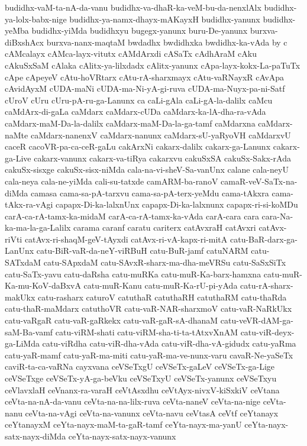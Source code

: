 {budidhx-vaM-ta-nA-da-vanu
budidhx-va-dhaR-ka-veM-bu-da-nenxlAlx
budidhx-ya-lolx-babx-nige
budidhx-ya-namx-dhayx-mAKayxH
budidhx-yanunx
budidhx-yeMba
budidhx-yiMda
budidhxyu
bugegx-yanunx
buru-De-yanunx
burxva-diBxshAcx
burxva-nanx-maqtaM
bwdadhx
bwdidhxka
bwdidhx-ka-vAda
by
c
cAMcalayx
cAMca-layx-vitutx
cAMdArxdi
cASaTx
cAdhAraM
cAku
cAkuSxSaM
cAlaka
cAlitx-ya-lilxdadx
cAlitx-yanunx
cApa-layx-kokx-La-paTuTx
cApe
cApeyeV
cAtu-hoVRtarx
cAtu-rA-sharxmayx
cAtu-vaRNayxR
cAvApa
cAvidAyxM
cUDA-maNi
cUDA-ma-Ni-yA-gi-ruva
cUDA-ma-Nuyx-pa-ni-Satf
cUroV
cUru
cUru-pA-ru-ga-Lanunx
ca
caLi-gAla
caLi-gA-la-dalilx
caMcu
caMdArx-di-gaLa
caMdarx
caMdarx-cUDa
caMdarx-ka-lA-dha-ra-vAda
caMdarx-maM-Da-la-dalilx
caMdarx-maM-Da-la-ga-tamf
caMdarxna
caMdarx-naMte
caMdarx-nanenxV
caMdarx-nanunx
caMdarx-sU-yaRyoVH
caMdarxvU
caceR
cacoVR-pa-ca-ceR-gaLu
cakArxNi
cakarx-dalilx
cakarx-ga-Lanunx
cakarx-ga-Live
cakarx-vanunx
cakarx-va-tiRya
cakarxvu
cakuSxSA
cakuSx-Sakx-rAda
cakuSx-sisxge
cakuSx-sisx-niMda
cala-na-vi-sheV-Sa-vanUnx
calane
cala-neyU
cala-neya
cala-ne-yiMda
cali-su-tatxde
camARM-ba-ranoV
camaR-veV-SaTx-na-diMda
camasa
cama-sa-pA-tarxvu
cama-sa-pA-terx-yeMdu
cama-tAkxra
cama-tAkx-ra-vAgi
capapx-Di-ka-lalxnUnx
capapx-Di-ka-lalxnunx
capapx-ri-si-koMDu
carA-ca-rA-tamx-ka-midaM
carA-ca-rA-tamx-ka-vAda
carA-cara
cara
cara-Na-ka-ma-la-ga-Lalilx
carama
caranf
caratu
cariterx
catAvxraH
catAvxri
catAvx-riVti
catAvx-ri-shaqM-geV-tAyxdi
catAvx-ri-vA-kapx-ri-mitA
catu-BaR-darx-ga-LanUnx
catu-BiR-vaR-da-neY-viRBuH
catu-BuR-jamf
catuNARM
catu-SATxdaM
catu-SApxdaM
catu-SAvxR-sharx-ma-dha-meVRSu
catu-SaSxSiTx
catu-SaTx-yavu
catu-daRsha
catu-muRKa
catu-muR-Ka-barx-hamxna
catu-muR-Ka-mu-KoV-daBxvA
catu-muR-Kanu
catu-muR-Ka-rU-pi-yAda
catu-rA-sharx-makUkx
catu-rasharx
caturoV
catuthaR
catuthaRH
catuthaRM
catu-thaRda
catu-thaR-maMdarx
catuthoVR
catu-vaR-NAR-sharxmoV
catu-vaR-NaRkUkx
catu-vaRgaR
catu-vaR-gaRkekx
catu-vaR-gaR-sA-dhanaM
catu-veVR-dAM-ga-saM-Ba-vamf
catu-viRM-shati
catu-viRM-sha-ti-ta-tAtxvXnAM
catu-viR-deyx-ga-LiMda
catu-viRdha
catu-viR-dha-vAda
catu-viR-dha-vA-gidudx
catu-yaRma
catu-yaR-mamf
catu-yaR-ma-miti
catu-yaR-ma-ve-nunx-varu
cavaR-Ne-yaSeTx
caviR-ta-ca-vaRNa
cayxvana
ceVSeTxgU
ceVSeTx-gaLeV
ceVSeTx-ga-Lige
ceVSeTxge
ceVSeTx-yA-ga-beVku
ceVSeTxyU
ceVSeTx-yanunx
ceVSeTxyu
ceVlavxlaH
ceVnanx-ra-varaH
ceVtAsxdhu
ceVtAyx-nivxV-kiSxkiV
ceVtana
ceVta-na-nA-da-vanu
ceVta-na-na-lilx-ruva
ceVta-naneV
ceVta-na-nige
ceVta-nanu
ceVta-na-vAgi
ceVta-na-vanunx
ceVta-navu
ceVtasA
ceVtf
ceYtanayx
ceYtanayxM
ceYta-nayx-maM-ta-gaR-tamf
ceYta-nayx-ma-yanU
ceYta-nayx-satx-nayx-diMda
ceYta-nayx-satx-nayx-vanunx
}
